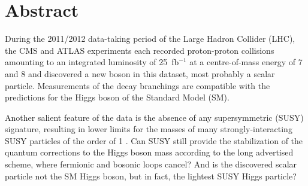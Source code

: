 \documentclass[11pt,a4paper]{article}
\begin{document}
\def\gluino{\mbox{$\tilde g$}\xspace}
\def\mgluino{\mbox{$m_{\tilde g}$}\xspace}
\def\mStop{\mbox{$m_{\tilde t}$}\xspace}
\def\mSbottom{\mbox{$m_{\tilde b}$}\xspace}
\def\mCha{\mbox{$m_{\tilde{\chi}^{\pm}_1}$}\xspace}
\def\mNeu{\mbox{$m_{\tilde{\chi}^{0}_1}$}\xspace}
\def\nbtags{\mbox{$n_{\cPqb\textrm{-tag}}$}\xspace}
\def\njets{\mbox{$n_{\textrm{jets}}$}\xspace}
\def\mT{\mbox{$m_{\textrm{T}}$}\xspace}
\newcommand{\jptratio}[2]{\mbox{$p_{\textrm{T\,\vline\,#1,#2}}^{\textrm{ratio}}$}\xspace}
\newcommand{\ptb}[1]{\mbox{$p_{\textrm{T}}^{}(b_#1)$}\xspace}
\def\mTW{\mbox{$m_{\textrm{T}2}^W$}\xspace}
\def\HT{\mbox{$H_{\textrm{T}}$}\xspace}
\def\HTratio{\mbox{$H_{\textrm{T}}^{\textrm{ratio}}$}\xspace}
\def\dphi{\mbox{$\Delta\phi(W,l)$}\xspace}
\def\dphimet{\mbox{$\Delta\phi(\ETmiss,j_{1,2})$}\xspace}
\def\ttjets{\mbox{\ensuremath{\cmsSymbolFace{t}\overline{\cmsSymbolFace{t}}}+jets}\xspace}
\def\wjets{\mbox{\ensuremath{W}+jets}\xspace}
\newcommand{\fixme}[1]{\textcolor{red}{FIXME: #1}} %
\newcommand{\tobechecked}[1]{\textcolor{red}{#1}\marginpar{\textcolor{red}{\textbf{X}}}}
\newcommand{\boldStart}[1]{\noindent{\bf{#1}}}
\onehalfspacing
\addtolength{\leftmargin}{-2in}
\thispagestyle{empty}

\section*{Abstract}
During the 2011/2012 data-taking period of the Large Hadron Collider (LHC), the CMS and ATLAS experiments each recorded proton-proton collisions amounting to an integrated luminosity of 25~fb$^{-1}$ at a centre-of-mass energy of 7 and 8 \TeV and discovered a new boson in this dataset, most probably a scalar particle. 
Measurements of the decay branchings are compatible with the predictions for the Higgs boson of the Standard Model (SM).

Another salient feature of the data is the absence of any supersymmetric (SUSY) signature, resulting in lower limits for the masses of many strongly-interacting SUSY particles of the order of 1 \TeV. %
Can SUSY still provide the stabilization of the quantum corrections to the Higgs boson mass according to the long advertised scheme,  where fermionic and bosonic loops cancel? 
And is the discovered scalar particle not the SM Higgs boson, but in fact, the lightest SUSY Higgs particle?
\end{document}

